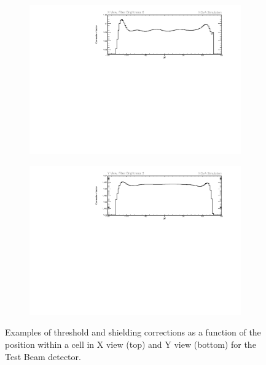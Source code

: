 \begin{figure}[!hbtp]
\centering
\begin{subfigure}[t]{\textwidth}
\centering
\includegraphics[width=\textwidth]{Plots/TBCalibration/ThresholdCorrectionExample_axview_fb0_P4DataBasedSim.pdf}
\end{subfigure}
\begin{subfigure}[b]{\textwidth}
\centering
\includegraphics[width=\textwidth]{Plots/TBCalibration/ThresholdCorrectionExample_ayview_fb3_P4DataBasedSim.pdf}
\end{subfigure}
\caption[Example threshold and shielding correction for Test Beam detector]{Examples of threshold and shielding corrections as a function of the position within a cell in X view (top) and Y view (bottom) for the Test Beam detector.}
\label{fig:TBThresholdCorrectionExamples}
\end{figure}

